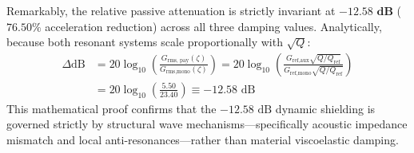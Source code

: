 \documentclass[preprint,12pt,3p]{elsarticle}
\newcommand{\Grmspay}{G_{\text{rms, pay}}}
\begin{document}
Remarkably, the relative passive attenuation is strictly invariant at $\mathbf{-12.58\text{ dB}}$ ($\mathbf{76.50\%}$ acceleration reduction) across all three damping values. Analytically, because both resonant systems scale proportionally with $\sqrt{Q}$:
\begin{equation}
  \begin{aligned}
    \Delta\text{dB} &= 20 \log_{10}\left( \frac{\Grmspay(\zeta)}{G_{\text{rms,mono}}(\zeta)} \right) = 20 \log_{10}\left( \frac{G_{\text{ref,aux}} \sqrt{Q / Q_{\text{ref}}}}{G_{\text{ref,mono}} \sqrt{Q / Q_{\text{ref}}}} \right) \\
    &= 20 \log_{10}\left( \frac{5.50}{23.40} \right) \equiv -12.58\text{ dB}
  \end{aligned}
\end{equation}
This mathematical proof confirms that the $-12.58\text{ dB}$ dynamic shielding is governed strictly by structural wave mechanisms—specifically acoustic impedance mismatch and local anti-resonances—rather than material viscoelastic damping.
\end{document}
